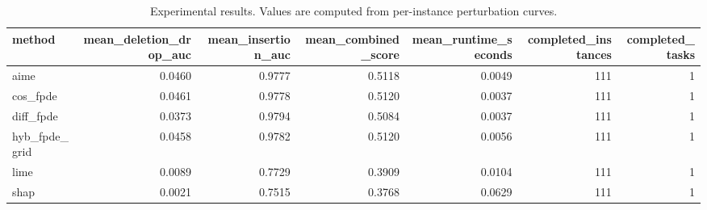 \begin{table}[t]
\caption{Experimental results. Values are computed from per-instance perturbation curves.}
\label{tab:main_results_computed}
\centering
\begin{tabular}{lrrrrrr}
\toprule
method & mean\_deletion\_drop\_auc & mean\_insertion\_auc & mean\_combined\_score & mean\_runtime\_seconds & completed\_instances & completed\_tasks \\
\midrule
aime & 0.0460 & 0.9777 & 0.5118 & 0.0049 & 111 & 1 \\
cos\_fpde & 0.0461 & 0.9778 & 0.5120 & 0.0037 & 111 & 1 \\
diff\_fpde & 0.0373 & 0.9794 & 0.5084 & 0.0037 & 111 & 1 \\
hyb\_fpde\_grid & 0.0458 & 0.9782 & 0.5120 & 0.0056 & 111 & 1 \\
lime & 0.0089 & 0.7729 & 0.3909 & 0.0104 & 111 & 1 \\
shap & 0.0021 & 0.7515 & 0.3768 & 0.0629 & 111 & 1 \\
\bottomrule
\end{tabular}

\end{table}
